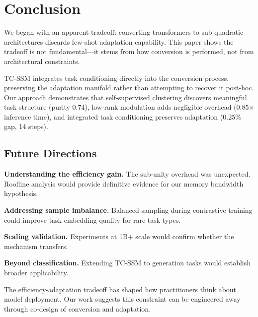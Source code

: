 \section{Conclusion}

We began with an apparent tradeoff: converting transformers to sub-quadratic architectures discards few-shot adaptation capability. This paper shows the tradeoff is not fundamental---it stems from how conversion is performed, not from architectural constraints.

TC-SSM integrates task conditioning directly into the conversion process, preserving the adaptation manifold rather than attempting to recover it post-hoc. Our approach demonstrates that self-supervised clustering discovers meaningful task structure (purity 0.74), low-rank modulation adds negligible overhead (0.85$\times$ inference time), and integrated task conditioning preserves adaptation (0.25\% gap, 14 steps).

\subsection{Future Directions}

\textbf{Understanding the efficiency gain.} The sub-unity overhead was unexpected. Roofline analysis would provide definitive evidence for our memory bandwidth hypothesis.

\textbf{Addressing sample imbalance.} Balanced sampling during contrastive training could improve task embedding quality for rare task types.

\textbf{Scaling validation.} Experiments at 1B+ scale would confirm whether the mechanism transfers.

\textbf{Beyond classification.} Extending TC-SSM to generation tasks would establish broader applicability.

The efficiency-adaptation tradeoff has shaped how practitioners think about model deployment. Our work suggests this constraint can be engineered away through co-design of conversion and adaptation.
